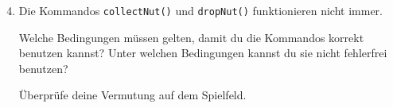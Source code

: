 \begin{enumerate}\setcounter{enumi}{3}
    \item Die Kommandos \lstinline{collectNut()} und \lstinline{dropNut()} funktionieren nicht immer.
    
        Welche Bedingungen müssen gelten, damit du die Kommandos korrekt benutzen kannst?
        Unter welchen Bedingungen kannst du sie nicht fehlerfrei benutzen?

        Überprüfe deine Vermutung  auf dem Spielfeld.
\end{enumerate}

